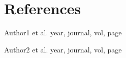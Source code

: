 \documentclass[12pt,a4paper]{article}
\begin{document}

\section{References}


\noindent [1] Author1 et al. year, journal, vol, page

\noindent [2] Author2 et al. year, journal, vol, page


\end{document}
